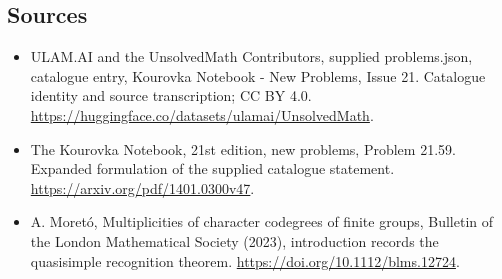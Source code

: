 \documentclass[11pt,a4paper]{article}
\begin{document}
\subsection{Sources}
\begin{itemize}
\item[S1] ULAM.AI and the UnsolvedMath Contributors, supplied problems.json, catalogue entry, Kourovka Notebook - New Problems, Issue 21. Catalogue identity and source transcription; CC BY 4.0.
\url{https://huggingface.co/datasets/ulamai/UnsolvedMath}.
\item[S2] The Kourovka Notebook, 21st edition, new problems, Problem 21.59. Expanded formulation of the supplied catalogue statement.
\url{https://arxiv.org/pdf/1401.0300v47}.
\item[S3] A. Moretó, Multiplicities of character codegrees of finite groups, Bulletin of the London Mathematical Society (2023), introduction records the quasisimple recognition theorem.
\url{https://doi.org/10.1112/blms.12724}.
\end{itemize}
\end{document}
